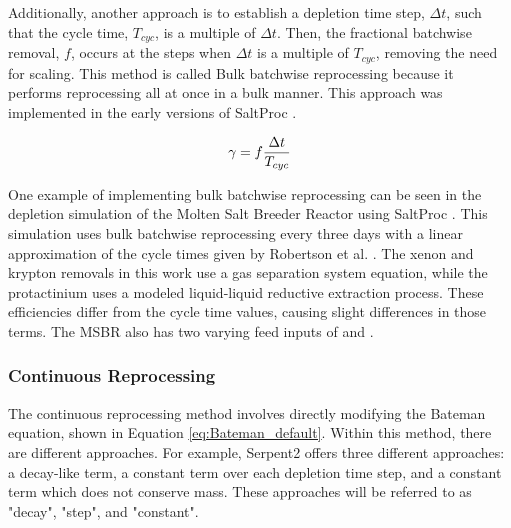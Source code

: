Additionally, another approach is to establish a depletion time step, $\Delta t$, such that the cycle time, $T_{cyc}$, is a multiple of $\Delta t$. Then, the fractional batchwise removal, $f$, occurs at the steps when $\Delta t$ is a multiple of $T_{cyc}$, removing the need for scaling. This method is called Bulk batchwise reprocessing because it performs reprocessing all at once in a bulk manner. This approach was implemented in the early versions of SaltProc \cite{rykhlevskii_modeling_2019}.

\begin{equation} \hfill 
\gamma = f \frac{\Delta t}{T_{cyc}}
\hfill\label{eq:batchwise_rem_eff} \end{equation}

One example of implementing bulk batchwise reprocessing can be seen in the depletion simulation of the Molten Salt Breeder Reactor using SaltProc \cite{rykhlevskii_modeling_2019}. This simulation uses bulk batchwise reprocessing every three days with a linear approximation of the cycle times given by Robertson et al. \cite{robertson_conceptual_1971, rykhlevskii_modeling_2019}. The xenon and krypton removals in this work use a gas separation system equation, while the protactinium uses a modeled liquid-liquid reductive extraction process. These efficiencies differ from the cycle time values, causing slight differences in those terms. The MSBR also has two varying feed inputs of  and .



\subsubsection{Continuous Reprocessing}

The continuous reprocessing method involves directly modifying the Bateman equation, shown in Equation \eqref{eq:Bateman_default}. Within this method, there are different approaches. For example, Serpent2 offers three different approaches: a decay-like term, a constant term over each depletion time step, and a constant term which does not conserve mass. These approaches will be referred to as "decay", "step", and "constant".

